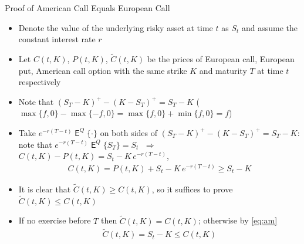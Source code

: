 \documentclass[10pt,handout]{beamer}
\newcommand{\ie}{\;\Longrightarrow\;}
\DeclareMathOperator\expc{\mathsf{E}}
\theoremstyle{definition}
\begin{document}
\begin{frame}{Proof of American Call Equals European Call}
  \begin{itemize}
    \item Denote the value of the underlying risky asset at time $t$ as $S_t$ and assume the constant interest rate $r$
    \item Let $C(t, K)$, $P(t, K)$, $\widetilde{C}(t, K)$ be the prices of European call, European put, American call option with the same strike $K$ and maturity $T$ at time $t$ respectively 
    \item Note that $(S_T - K)^+ - (K - S_T)^+ = S_T - K$ ($\max\{f, 0\} - \max\{-f, 0\} = \max\{f, 0\} + \min\{f, 0\} = f$) 
    \item Take $e^{-r(T - t)}\expc^Q\{\cdot\}$ on both sides of $(S_T - K)^+ - (K - S_T)^+ = S_T - K$: note that $e^{-r(T - t)}\expc^Q\{S_T\} = S_t$ $\ie$ $C(t, K) - P(t, K) = S_t - K\,e^{-r(T - t)}$, 
      \begin{align}\label{eq:am}
        C(t, K) = P(t, K) + S_t - K\,e^{-r(T - t)} \geqslant S_t - K
      \end{align}
    \item It is clear that $\widetilde{C}(t, K)\geqslant C(t, K)$, so it suffices to prove $\widetilde{C}(t, K)\leqslant C(t, K)$
    \item If no exercise before $T$ then $\widetilde{C}(t, K) = C(t, K)$; otherwise by \eqref{eq:am} 
      \begin{align*}
        \widetilde{C}(t, K) = S_t - K\leqslant C(t, K)
      \end{align*}
  \end{itemize}
\end{frame}
\end{document}
